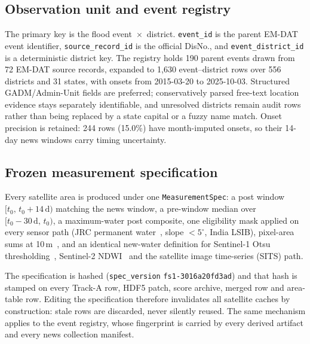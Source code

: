 \documentclass[conference]{IEEEtran}
\begin{document}
\subsection{Observation unit and event registry}
The primary key is the flood event~$\times$~district. \texttt{event\_id} is the
parent EM-DAT~\cite{emdat} event identifier, \texttt{source\_record\_id} is the
official DisNo., and \texttt{event\_district\_id} is a deterministic district
key. The registry holds 190 parent events drawn from 72 EM-DAT source records,
expanded to 1{,}630 event--district rows over 556 districts and 31 states, with
onsets from 2015-03-20 to 2025-10-03. Structured GADM/Admin-Unit fields are
preferred; conservatively parsed free-text location evidence stays separately
identifiable, and unresolved districts remain audit rows rather than being
replaced by a state capital or a fuzzy name match. Onset precision is retained:
244 rows (15.0\%) have month-imputed onsets, so their 14-day news windows carry
timing uncertainty.

\subsection{Frozen measurement specification}\label{sec:spec}
Every satellite area is produced under one \texttt{MeasurementSpec}: a post
window $[t_0,\,t_0+14\,\mathrm{d})$ matching the news window, a pre-window
median over $[t_0-30\,\mathrm{d},\,t_0)$, a maximum-water post composite, one
eligibility mask applied on every sensor path (JRC permanent
water~\cite{pekel2016}, slope $<5^\circ$, India LSIB), pixel-area sums at
10\,m~\cite{gorelick2017}, and an identical new-water definition for
Sentinel-1 Otsu thresholding~\cite{torres2012,otsu1979}, Sentinel-2
NDWI~\cite{drusch2012,mcfeeters1996} and the satellite image time-series (SITS)
path.

The specification is hashed (\texttt{spec\_version} \texttt{fs1-3016a20fd3ad})
and that hash is stamped on every Track-A row, HDF5 patch, score archive, merged
row and area-table row. Editing the specification therefore invalidates all
satellite caches by construction: stale rows are discarded, never silently
reused. The same mechanism applies to the event registry, whose fingerprint is
carried by every derived artifact and every news collection manifest.
\end{document}
